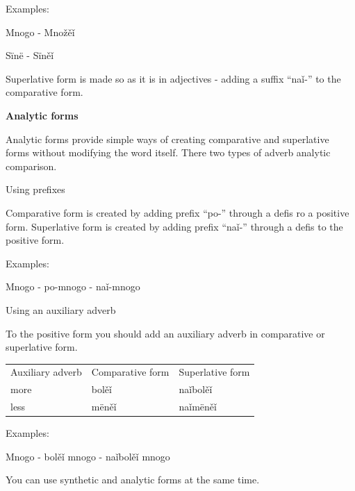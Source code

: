 Examples:

Mnogo - Množěǐ

Sïnë - Sïněǐ

Superlative form is made so as it is in adjectives - adding a suffix “naǐ-” to the comparative form.

\textbf{Analytic forms}

Analytic forms provide simple ways of creating comparative and superlative forms without modifying the word itself. There two types of adverb analytic comparison.

Using prefixes

Comparative form is created by adding prefix “po-” through a defis ro a positive form. Superlative form is created by adding prefix “naǐ-” through a defis to the positive form.

Examples:

Mnogo - po-mnogo - naǐ-mnogo

Using an auxiliary adverb

To the positive form you should add an auxiliary adverb in comparative or superlative form.

\begin{table}
	\begin{tabular}{lll}
		Auxiliary adverb
		& Comparative form
		& Superlative form \\
		more & bolěǐ & naǐbolěǐ \\
		less & mëněǐ & naǐmëněǐ \\
	\end{tabular}
\end{table}

Examples:

Mnogo - bolěǐ mnogo - naǐbolěǐ mnogo

You can use synthetic and analytic forms at the same time.
